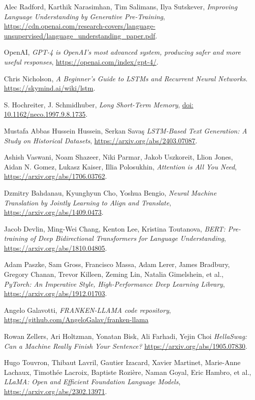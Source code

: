 \begin{thebibliography}{9}
	Alec Radford, Karthik Narasimhan, Tim Salimans, Ilya Sutskever,
	\textit{Improving Language Understanding by Generative Pre-Training},
	\url{https://cdn.openai.com/research-covers/language-unsupervised/language_understanding_paper.pdf}.

	OpenAI,
	\textit{GPT-4 is OpenAI’s most advanced system, producing safer and more useful responses},
	\url{https://openai.com/index/gpt-4/}.

	Chris Nicholson,
	\textit{A Beginner’s Guide to LSTMs and Recurrent Neural Networks}.
	\url{https://skymind.ai/wiki/lstm}.

	S. Hochreiter, J. Schmidhuber, 
	\textit{Long Short-Term Memory},
	\url{doi: 10.1162/neco.1997.9.8.1735}.

	Mustafa Abbas Hussein Hussein, Serkan Savaş
	\textit{LSTM-Based Text Generation: A Study on Historical Datasets},
	\url{https://arxiv.org/abs/2403.07087}.

	Ashish Vaswani, Noam Shazeer, Niki Parmar, Jakob Uszkoreit, Llion Jones, Aidan N. Gomez, Lukasz Kaiser, Illia Polosukhin,
	\textit{Attention is All You Need},
	\url{https://arxiv.org/abs/1706.03762}.

	Dzmitry Bahdanau, Kyunghyun Cho, Yoshua Bengio,
	\textit{Neural Machine Translation by Jointly Learning to Align and Translate},
	\url{https://arxiv.org/abs/1409.0473}.

	Jacob Devlin, Ming-Wei Chang, Kenton Lee, Kristina Toutanova,
	\textit{BERT: Pre-training of Deep Bidirectional Transformers for Language Understanding},
	\url{https://arxiv.org/abs/1810.04805}.

	Adam Paszke, Sam Gross, Francisco Massa, Adam Lerer, James Bradbury, Gregory Chanan, Trevor Killeen, Zeming Lin, Natalia Gimelshein, et al.,
	\textit{PyTorch: An Imperative Style, High-Performance Deep Learning Library},
	\url{https://arxiv.org/abs/1912.01703}.

	Angelo Galavotti,
	\textit{FRANKEN-LLAMA code repository},
	\url{https://github.com/AngeloGalav/franken-llama}

	Rowan Zellers, Ari Holtzman, Yonatan Bisk, Ali Farhadi, Yejin Choi
	\textit{HellaSwag: Can a Machine Really Finish Your Sentence?}
	\url{https://arxiv.org/abs/1905.07830}.

	Hugo Touvron, Thibaut Lavril, Gautier Izacard, Xavier Martinet, Marie-Anne Lachaux, Timothée Lacroix, Baptiste Rozière, Naman Goyal, Eric Hambro, et al.,
	\textit{LLaMA: Open and Efficient Foundation Language Models},
	\url{https://arxiv.org/abs/2302.13971}.


\end{thebibliography}
